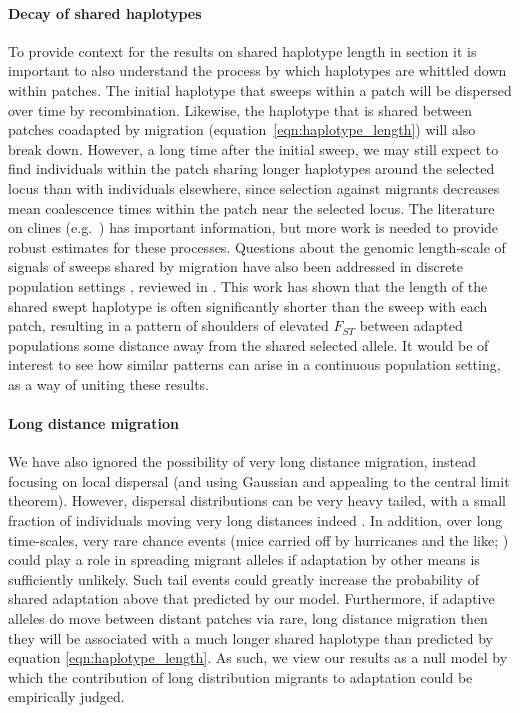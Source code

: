 \documentclass{article}
\newcommand{\linelabel}[1]{}
\newcommand{\citep}[1]{\cite{#1}}
\newcommand{\citet}[1]{\cite{#1}}
\newcommand{\secref}[1]{{\emph{\nameref{#1}}}}
\begin{document}
\paragraph{Decay of shared haplotypes} \linelabel{rr:haplotype_discussion}
To provide context for the results on shared haplotype length in
section \secref{ss:haplotype_length}
it is important to also understand
the process by which haplotypes are whittled down within patches.
The initial haplotype that sweeps within a patch 
will be dispersed over time by recombination.
Likewise, the haplotype that is shared between patches coadapted by migration
(equation~\ref{eqn:haplotype_length}) will also break down. 
However, a long time after the initial sweep,
we may still expect to find individuals within the patch sharing longer haplotypes around the selected locus
than with individuals elsewhere,
since selection against migrants 
decreases mean coalescence times within the patch near the selected locus.  %
The literature on clines (e.g.\ \citet{barton1979geneflow}) has important information,
but more work is needed
to provide robust estimates for these processes.
Questions about the genomic length-scale of signals of
sweeps shared by migration have also been addressed in discrete
population settings \citep{slatkin1998hitchhiking,kim2011hitchhiking}, reviewed in \citet{barton2000genetic}. 
This work has shown that the length of the shared swept haplotype is often significantly
shorter than the sweep with each patch, resulting in a pattern of
shoulders of elevated $F_{ST}$ between adapted populations some distance away from
the shared selected allele. It would be of interest to see how similar
patterns can arise in a continuous population setting, as a way of
uniting these results.

\paragraph{Long distance migration}
We have also ignored the possibility of very long distance migration,
instead focusing on local dispersal (and using Gaussian and appealing to the central limit theorem).
However, dispersal distributions can be very heavy tailed, 
with a small fraction of individuals moving very long distances indeed \citep{levin2003ecology,reynolds2009levy}.
In addition, over long time-scales, very rare chance events (mice carried off by hurricanes and the like; \citet{censky1998overwater,nathan2008mechanisms})
could play a role in spreading migrant alleles if adaptation by other means is sufficiently unlikely.
Such tail events could greatly increase the probability of shared adaptation above that predicted by our model. 
Furthermore, if adaptive alleles do move between distant patches via rare, long distance migration 
then they will be associated with a much longer shared haplotype than predicted by equation \eqref{eqn:haplotype_length}. 
As such, we view our results as a null model by which the contribution of long distribution migrants to adaptation could be empirically judged.   
\end{document}
